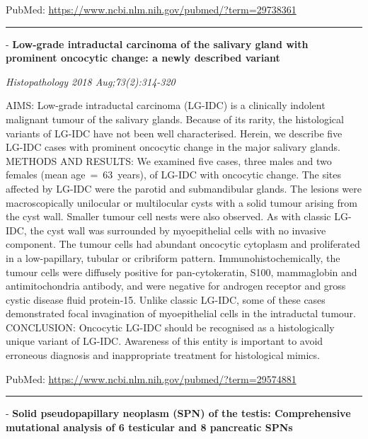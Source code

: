 \documentclass[]{article}
\begin{document}
PubMed: \url{https://www.ncbi.nlm.nih.gov/pubmed/?term=29738361}

{}

{}

\begin{center}\rule{0.5\linewidth}{\linethickness}\end{center}

 - \textbf{Low-grade intraductal carcinoma of the salivary gland with
prominent oncocytic change: a newly described variant}

\emph{Histopathology 2018 Aug;73(2):314-320}

AIMS: Low-grade intraductal carcinoma (LG-IDC) is a clinically indolent
malignant tumour of the salivary glands. Because of its rarity, the
histological variants of LG-IDC have not been well characterised.
Herein, we describe five LG-IDC cases with prominent oncocytic change in
the major salivary glands. METHODS AND RESULTS: We examined five cases,
three males and two females (mean age~=~63~years), of LG-IDC with
oncocytic change. The sites affected by LG-IDC were the parotid and
submandibular glands. The lesions were macroscopically unilocular or
multilocular cysts with a solid tumour arising from the cyst wall.
Smaller tumour cell nests were also observed. As with classic LG-IDC,
the cyst wall was surrounded by myoepithelial cells with no invasive
component. The tumour cells had abundant oncocytic cytoplasm and
proliferated in a low-papillary, tubular or cribriform pattern.
Immunohistochemically, the tumour cells were diffusely positive for
pan-cytokeratin, S100, mammaglobin and antimitochondria antibody, and
were negative for androgen receptor and gross cystic disease fluid
protein-15. Unlike classic LG-IDC, some of these cases demonstrated
focal invagination of myoepithelial cells in the intraductal tumour.
CONCLUSION: Oncocytic LG-IDC should be recognised as a histologically
unique variant of LG-IDC. Awareness of this entity is important to avoid
erroneous diagnosis and inappropriate treatment for histological mimics.

PubMed: \url{https://www.ncbi.nlm.nih.gov/pubmed/?term=29574881}

{}

{}

\begin{center}\rule{0.5\linewidth}{\linethickness}\end{center}

 - \textbf{Solid pseudopapillary neoplasm (SPN) of the testis:
Comprehensive mutational analysis of 6 testicular and 8 pancreatic SPNs}
\end{document}
